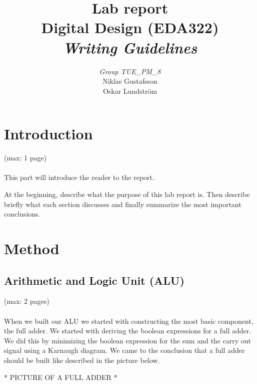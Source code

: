 \documentclass[a4paper,11pt]{article}
\begin{document}
\pagestyle{empty}
\begin{titlepage}

\title{\Huge{Lab report} \\[0.1cm] \Large{Digital Design (EDA322)} \\ [0.4cm] \Large{ \emph{Writing Guidelines}} \\[0.4cm]}
\author{\large{\emph{Group TUE\_PM\_8}} \\[0.2cm] Niklas Gustafsson \\[0.05cm] Oskar Lundström \\[0.1cm]}
\maketitle
\thispagestyle{empty}
\end{titlepage}
\clearpage
\pagestyle{fancyplain}
\tableofcontents
\clearpage
\setcounter{page}{1}
\section{Introduction}
(max: 1 page)
\\\\
This part will introduce the reader to the report. 

At the beginning, describe what the purpose of this lab report is. Then describe briefly what each section discusses and finally summarize the most important conclusions. 

\section{Method}
\subsection{Arithmetic and Logic Unit (ALU)}
(max: 2 pages)
\\\\
When we built our ALU we started with constructing the most basic component, the full adder. We started with deriving the boolean expressions for a full adder. We did this by minimizing the boolean expression for the sum and the carry out signal using a Karnaugh diagram. We came to the conclusion that a full adder should be built like described in the picture below. 

* PICTURE OF A FULL ADDER *
\end{document}

